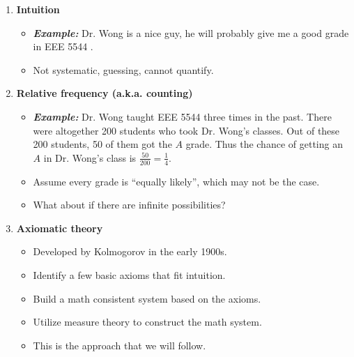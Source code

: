 \begin{enumerate}[resume]
\item \textbf{Intuition}

\begin{itemize}
\item \textit{\textbf{Example:}} Dr. Wong is a nice guy, he will probably give me a good grade in EEE 5544 .
\item Not systematic, guessing, cannot quantify.
\end{itemize}


\item \textbf{Relative frequency (a.k.a. counting)}

\begin{itemize}
\item \textit{\textbf{Example:}} Dr. Wong taught EEE 5544 three times in the past. There were altogether 200 students who took Dr. Wong's classes. Out of these 200 students, 50 of them got the $A$ grade. Thus the chance of getting an $A$ in Dr. Wong's class is $\frac{50}{200}=\frac{1}{4}$.
\item Assume every grade is ``equally likely'', which may not be the case.
\item What about if there are infinite possibilities?
\end{itemize}


\item \textbf{Axiomatic theory}

\begin{itemize}
\item Developed by Kolmogorov in the early 1900s.
\item Identify a few basic axioms that fit intuition.
\item Build a math consistent system based on the axioms.
\item Utilize measure theory to construct the math system.
\item This is the approach that we will follow.
\end{itemize}
\end{enumerate}